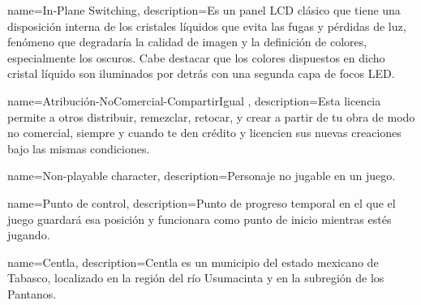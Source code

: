 

{
	name={In-Plane Switching},
	description={Es un panel LCD clásico que tiene una disposición interna de los cristales líquidos que evita las fugas y pérdidas de luz, fenómeno que degradaría la calidad de imagen y la definición de colores, especialmente los oscuros. Cabe destacar que los colores dispuestos en dicho cristal líquido son iluminados por detrás con una segunda capa de focos LED.}
}

{
	name={Atribución-NoComercial-CompartirIgual },
	description={Esta licencia permite a otros distribuir, remezclar, retocar, y crear a partir de tu obra de modo no comercial, siempre y cuando te den crédito y licencien sus nuevas creaciones bajo las mismas condiciones.}
}

{
	name={Non-playable character},
	description={Personaje no jugable en un juego.}
}

{
	name={Punto de control},
	description={Punto de progreso temporal en el que el juego guardará esa posición y funcionara como punto de inicio mientras estés jugando.}
}

{
	name={Centla},
	description={Centla es un municipio del estado mexicano de Tabasco, localizado en la región del río Usumacinta y en la subregión de los Pantanos.}
}

